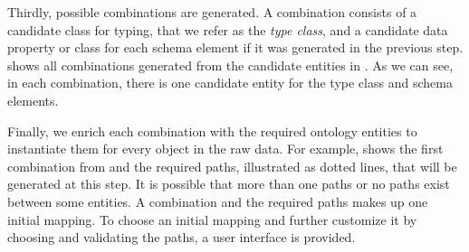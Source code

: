 Thirdly, possible combinations are generated. A combination consists of a candidate class for typing, that we refer as the \emph{type class}, and a candidate data property or class for each schema element if it was generated in the previous step.  shows all combinations generated from the candidate entities in . As we can see, in each combination, there is one candidate entity for the type class and schema elements.

\begin{table}[]
	\centering
	\caption{Combinations of generated entities for type class and schema elements}
	\label{tab:overviewCombinationsElements}
\end{table}

Finally, we enrich each combination with the required ontology entities to instantiate them for every object in the raw data. For example,  shows the first combination from  and the required paths, illustrated as dotted lines, that will be generated at this step. It is possible that more than one paths or no paths exist between some entities. A combination and the required paths makes up one initial mapping. To choose an initial mapping and further customize it by choosing and validating the paths, a user interface is provided.

